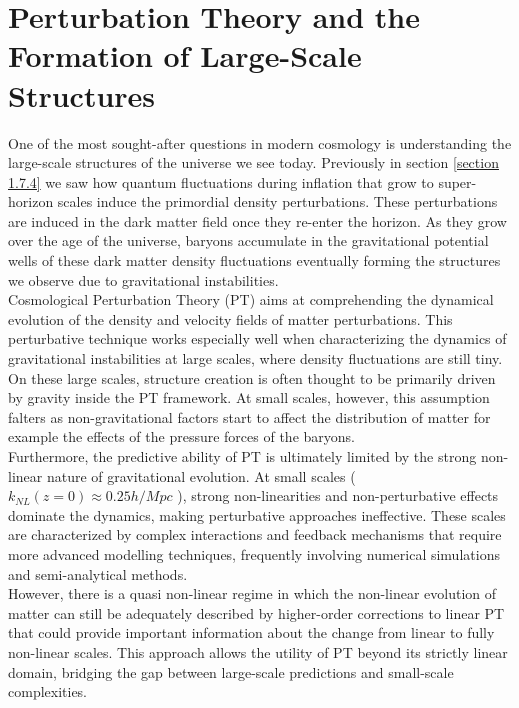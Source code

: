 \chapter{Perturbation Theory and the Formation of Large-Scale Structures}\label{PT}
\justifying

One of the most sought-after questions in modern cosmology is understanding the large-scale structures of the universe we see today. Previously in section \ref{section 1.7.4} we saw how quantum fluctuations during inflation that grow to super-horizon scales induce the primordial density perturbations.
These perturbations are induced in the dark matter field once they re-enter the horizon. As they grow over the age of the universe, baryons accumulate in the gravitational potential wells of these dark matter density fluctuations eventually forming the structures we observe due to gravitational instabilities.\\

Cosmological Perturbation Theory (PT) aims at comprehending the dynamical evolution of the density and velocity fields of matter perturbations. This perturbative technique works especially well when characterizing the dynamics of gravitational instabilities at large scales, where density fluctuations are still tiny. On these large scales, structure creation is often thought to be primarily driven by gravity inside the PT framework. At small scales, however, this assumption falters as non-gravitational factors start to affect the distribution of matter for example the effects of the pressure forces of the baryons.\\

Furthermore, the predictive ability of PT is ultimately limited by the strong non-linear nature of gravitational evolution. At small scales ($k_{NL}(z = 0) \approx 0.25 h/Mpc$ \cite{Dodelson}), strong non-linearities and non-perturbative effects dominate the dynamics, making perturbative approaches ineffective. These scales are characterized by complex interactions and feedback mechanisms that require more advanced modelling techniques, frequently involving numerical simulations and semi-analytical methods.\\

However, there is a quasi non-linear regime in which the non-linear evolution of matter can still be adequately described by higher-order corrections to linear PT that could provide important information about the change from linear to fully non-linear scales. This approach allows the utility of PT beyond its strictly linear domain, bridging the gap between large-scale predictions and small-scale complexities. \\

